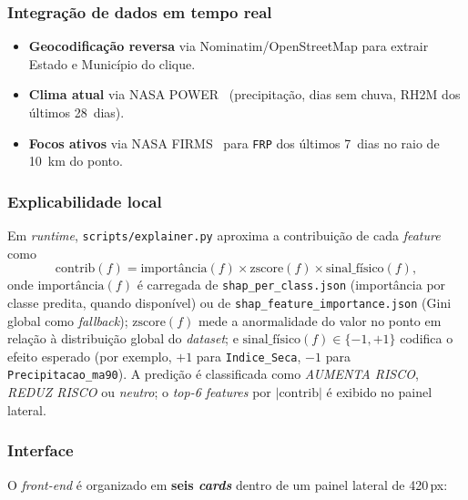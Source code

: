 \subsubsection{Integração de dados em tempo real}

\begin{itemize}
  \item \textbf{Geocodificação reversa} via Nominatim/OpenStreetMap para extrair Estado e Município do clique.
  \item \textbf{Clima atual} via NASA POWER~\cite{nasapower} (precipitação, dias sem chuva, RH2M dos últimos 28~dias).
  \item \textbf{Focos ativos} via NASA FIRMS~\cite{nasafirms} para \texttt{FRP} dos últimos 7~dias no raio de \SI{10}{\km} do ponto.
\end{itemize}

\subsubsection{Explicabilidade local}

Em \emph{runtime}, \texttt{scripts/explainer.py} aproxima a contribuição de cada \emph{feature} como
\begin{equation}
\text{contrib}(f) = \text{importância}(f) \times \text{zscore}(f) \times \text{sinal\_físico}(f),
\end{equation}
onde \(\text{importância}(f)\) é carregada de \texttt{shap\_per\_class.json} (importância por classe predita, quando disponível) ou de \texttt{shap\_feature\_importance.json} (Gini global como \emph{fallback}); \(\text{zscore}(f)\) mede a anormalidade do valor no ponto em relação à distribuição global do \emph{dataset}; e \(\text{sinal\_físico}(f) \in \{-1, +1\}\) codifica o efeito esperado (por exemplo, \(+1\) para \texttt{Indice\_Seca}, \(-1\) para \texttt{Precipitacao\_ma90}). A predição é classificada como \emph{AUMENTA RISCO}, \emph{REDUZ RISCO} ou \emph{neutro}; o \emph{top-6 features} por \(|\text{contrib}|\) é exibido no painel lateral.

\subsubsection{Interface}

O \emph{front-end} é organizado em \textbf{seis \emph{cards}} dentro de um painel lateral de \num{420}\,px:

